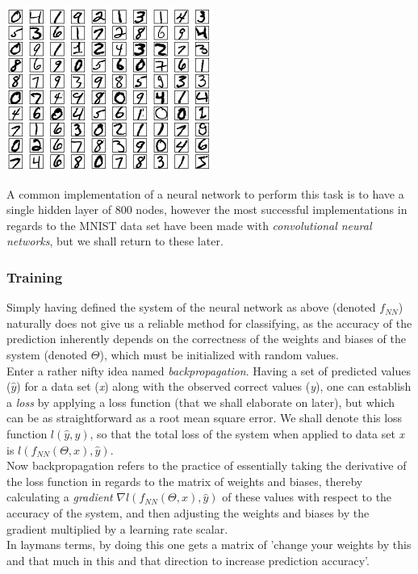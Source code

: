 \begin{Figure}
 \centering
 \includegraphics[width=0.7\linewidth]{images/mnist}
 \captionsetup{width=0.8\linewidth, font=small}
\end{Figure}

\noindent A common implementation of a neural network to perform this task is to have a single hidden layer of 800 nodes, however the most successful implementations in regards to the MNIST data set have been made with \textit{convolutional neural networks}, but we shall return to these later.

\subsubsection{Training}
Simply having defined the system of the neural network as above (denoted $f_{NN}$) naturally does not give us a reliable method for classifying, as the accuracy of the prediction inherently depends on the correctness of the weights and biases of the system (denoted $\Theta$), which must be initialized with random values. \\
Enter a rather nifty idea named \textit{backpropagation}. Having a set of predicted values ($\hat{y}$) for a data set (\textit{x}) along with the observed correct values (\textit{y}), one can establish a \textit{loss} by applying a loss function (that we shall elaborate on later), but which can be as straightforward as a root mean square error. We shall denote this loss function $l(\hat{y},y)$, so that the  total loss of the system when applied to data set \textit{x} is $l(f_{NN}(\Theta, x), \hat{y})$.\\
Now backpropagation refers to the practice of essentially taking the derivative of the loss function in regards to the matrix of weights and biases, thereby calculating a \textit{gradient} $\nabla{l(f_{NN}(\Theta, x), \hat{y})}$ of these values with respect to the accuracy of the system, and then adjusting the weights and biases by the gradient multiplied by a learning rate scalar.\\
In laymans terms, by doing this one gets a matrix of 'change your weights by this and that much in this and that direction to increase prediction accuracy'.
%


